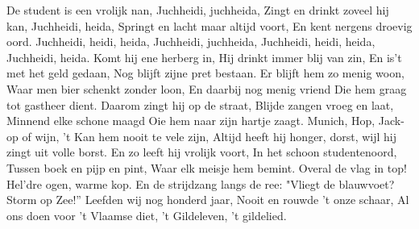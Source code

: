 \beginverse
De student is een vrolijk nan,
Juchheidi, juchheida,
Zingt en drinkt zoveel hij kan,
Juchheidi, heida,
Springt en lacht maar altijd voort,
En kent nergens droevig oord.
\endverse
\beginchorus
Juchheidi, heidi, heida,
Juchheidi, juchheida,
Juchheidi, heidi, heida,
Juchheidi, heida.
\endchorus
\beginverse
Komt hij ene herberg in,
Hij drinkt immer blij van zin,
En is't met het geld gedaan,
Nog blijft zijne pret bestaan.
\endverse
\beginverse
Er blijft hem zo menig woon,
Waar men bier schenkt zonder loon,
En daarbij nog menig vriend
Die hem graag tot gastheer dient.
\endverse
\beginverse
Daarom zingt hij op de straat,
Blijde zangen vroeg en laat,
Minnend elke schone maagd
Oie hem naar zijn hartje zaagt.
\endverse
\beginverse
Munich, Hop, Jack-op of wijn,
't Kan hem nooit te vele zijn,
Altijd heeft hij honger, dorst,
wijl hij zingt uit volle borst.
\endverse
\beginverse
En zo leeft hij vrolijk voort,
In het schoon studentenoord,
Tussen boek en pijp en pint,
Waar elk meisje hem bemint.
\endverse
\beginverse
Overal de vlag in top!
Hel'dre ogen, warme kop.
En de strijdzang langs de ree:
"Vliegt de blauwvoet? Storm op Zee!”
\endverse
\beginverse
Leefden wij nog honderd jaar,
Nooit en rouwde 't onze schaar,
Al ons doen voor 't Vlaamse diet,
't Gildeleven, 't gildelied.
\endverse
\endsong